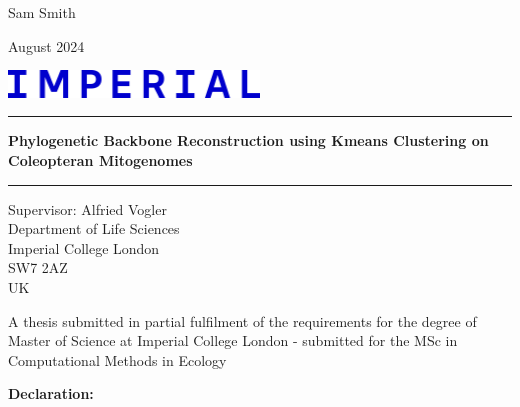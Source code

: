 \documentclass[12pt]{article}
\date{}
\begin{document}
\begin{titlepage}

  \begin{minipage}[t]{0.5\textwidth}
    \raggedright
    \large
    Sam Smith
  \end{minipage}%
  \begin{minipage}[t]{0.5\textwidth}
    \raggedleft
    \large
    August 2024
  \end{minipage}

  \vspace{0.6in}
  
  \begin{center}
    \includegraphics[width=0.5\textwidth]{imperiallogo.jpg}
  \end{center}
  
  \vspace{0.5in}
  
  \rule{\linewidth}{1.2mm}
  \begin{center}
    \LARGE
    \textbf{Phylogenetic Backbone Reconstruction using Kmeans Clustering on Coleopteran Mitogenomes}
  \end{center}
  \rule{\linewidth}{1.2mm}
  
  \vspace{0.5in}
  
  \begin{center}
    \large Supervisor: Alfried Vogler \\ Department of Life Sciences \\ Imperial College London \\ SW7 2AZ \\ UK
  \end{center}
  
  \vspace{0.6in}
  
  \begin{center}
    \large A thesis submitted in partial fulfilment of the requirements for the degree of Master of Science at Imperial College London - submitted for the MSc in Computational Methods in Ecology
  \end{center}

\end{titlepage}

\onehalfspacing
\setcounter{tocdepth}{2}

\newpage
\textbf{\large Declaration:}
\end{document}
